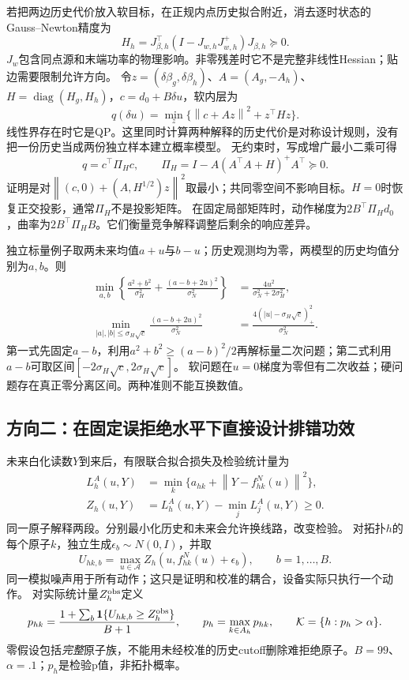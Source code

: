 \documentclass[UTF8,fontset=fandol,11pt,a4paper]{ctexart}
\newcommand{\norm}[1]{\left\lVert#1\right\rVert}
\begin{document}
若把两边历史代价放入软目标，在正规内点历史拟合附近，消去逐时状态的Gauss--Newton精度为
\[
 H_h=J_{\beta,h}^\top(I-J_{w,h}J_{w,h}^+)J_{\beta,h}\succeq0 .
\]
$J_w$包含同点源和末端功率的物理影响。非零残差时它不是完整非线性Hessian；贴边需要限制允许方向。
令$z=(\delta\beta_g,\delta\beta_h)$、$A=(A_g,-A_h)$、$H=\operatorname{diag}(H_g,H_h)$，$c=d_0+B\delta u$，软内层为
\begin{equation}
 q(\delta u)=\min_z\{\norm{c+Az}^2+z^\top Hz\}.
 \label{eq:softqp}
\end{equation}
线性界存在时它是QP。这里同时计算两种解释的历史代价是对称设计规则，没有把一份历史当成两份独立样本建立概率模型。
无约束时，写成增广最小二乘可得
\[
 q=c^\top\Pi_Hc,\qquad
 \Pi_H=I-A(A^\top A+H)^+A^\top\succeq0 .
\]
证明是对$\norm{(c,0)+(A,H^{1/2})z}^2$取最小；共同零空间不影响目标。$H=0$时恢复正交投影，通常$\Pi_H$不是投影矩阵。
在固定局部矩阵时，动作梯度为$2B^\top\Pi_Hd_0$，曲率为$2B^\top\Pi_HB$。它们衡量竞争解释调整后剩余的响应差异。

独立标量例子取两未来均值$a+u$与$b-u$；历史观测均为零，两模型的历史均值分别为$a,b$。则
\begin{align}
 \min_{a,b}\left\{\frac{a^2+b^2}{\sigma_H^2}
 +\frac{(a-b+2u)^2}{\sigma_N^2}\right\}
 &=\frac{4u^2}{\sigma_N^2+2\sigma_H^2},\\
 \min_{|a|,|b|\le\sigma_H\sqrt c}
 \frac{(a-b+2u)^2}{\sigma_N^2}
 &=\frac{4(|u|-\sigma_H\sqrt c)_+^2}{\sigma_N^2}.
\end{align}
第一式先固定$a-b$，利用$a^2+b^2\ge(a-b)^2/2$再解标量二次问题；第二式利用$a-b$可取区间$[-2\sigma_H\sqrt c,2\sigma_H\sqrt c]$。
软问题在$u=0$梯度为零但有二次收益；硬问题存在真正零分离区间。两种准则不能互换数值。

\subsection{方向二：在固定误拒绝水平下直接设计排错功效}
未来白化读数$Y$到来后，有限联合拟合损失及检验统计量为
\begin{align}
 L_h^{A}(u,Y)&=\min_k\{a_{hk}+\norm{Y-f^N_{hk}(u)}^2\},\\
 Z_h(u,Y)&=L_h^{A}(u,Y)-\min_j L_j^{A}(u,Y)\ge0 .
\end{align}
同一原子解释两段。分别最小化历史和未来会允许换线路，改变检验。
对拓扑$h$的每个原子$k$，独立生成$\epsilon_b\sim N(0,I)$，并取
\[
 U_{hk,b}=\max_{u\in\mathcal A}
 Z_h(u,f^N_{hk}(u)+\epsilon_b),\qquad b=1,\ldots,B .
\]
同一模拟噪声用于所有动作；这只是证明和校准的耦合，设备实际只执行一个动作。
对实际统计量$Z_h^{\rm obs}$定义
\begin{equation}
 p_{hk}=\frac{1+\sum_b\mathbf1\{U_{hk,b}\ge Z_h^{\rm obs}\}}{B+1},
 \qquad p_h=\max_{k\in A_h}p_{hk},\qquad
 \mathcal K=\{h:p_h>\alpha\}.
 \label{eq:ranktest}
\end{equation}
零假设包括\emph{完整}原子族，不能用未经校准的历史cutoff删除难拒绝原子。$B=99$、$\alpha=.1$；$p_h$是检验p值，非拓扑概率。
\end{document}
